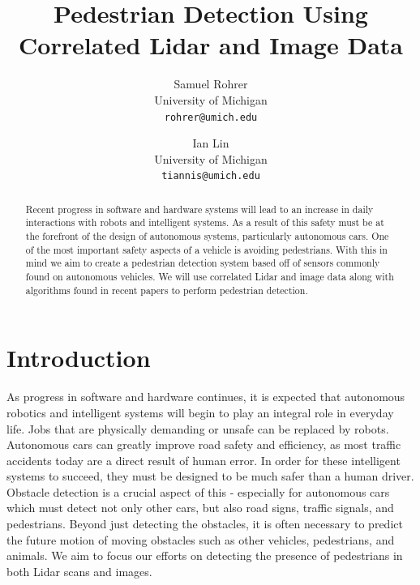 \documentclass[10pt,twocolumn,letterpaper]{article}
\begin{document}
\title{Pedestrian Detection Using Correlated Lidar and Image Data}

\author{Samuel Rohrer\\
University of Michigan\\
{\tt\small rohrer@umich.edu}
\and
Ian Lin\\
University of Michigan\\
{\tt\small tiannis@umich.edu}
}

\maketitle

\begin{abstract}
  Recent progress in software and hardware systems will lead to an increase in
  daily interactions with robots and intelligent systems. As a result of this
  safety must be at the forefront of the design of autonomous systems,
  particularly autonomous cars. One of the most important safety aspects of a 
  vehicle is avoiding pedestrians. With this in mind we aim to create a pedestrian
  detection system based off of sensors commonly found on autonomous vehicles.
  We will use correlated Lidar and image data along with algorithms found in
  recent papers to perform pedestrian detection.

\end{abstract}

\section{Introduction}

  As progress in software and hardware continues, it is expected that
  autonomous robotics and intelligent systems will begin to play an integral
  role in everyday life. Jobs that are physically demanding or unsafe can be
  replaced by robots. Autonomous cars can greatly improve road safety and
  efficiency, as most traffic accidents today are a direct result of human error.
  In order for these intelligent systems to succeed, they must be designed
  to be much safer than a human driver. Obstacle detection is a crucial aspect 
  of this - especially for autonomous cars which
  must detect not only other cars, but also road signs, traffic signals, and
  pedestrians. Beyond just detecting the obstacles, it is often necessary
  to predict the future motion of moving obstacles such as other vehicles, 
  pedestrians, and animals. We aim to focus our efforts on detecting the presence
  of pedestrians in both Lidar scans and images.
\end{document}

